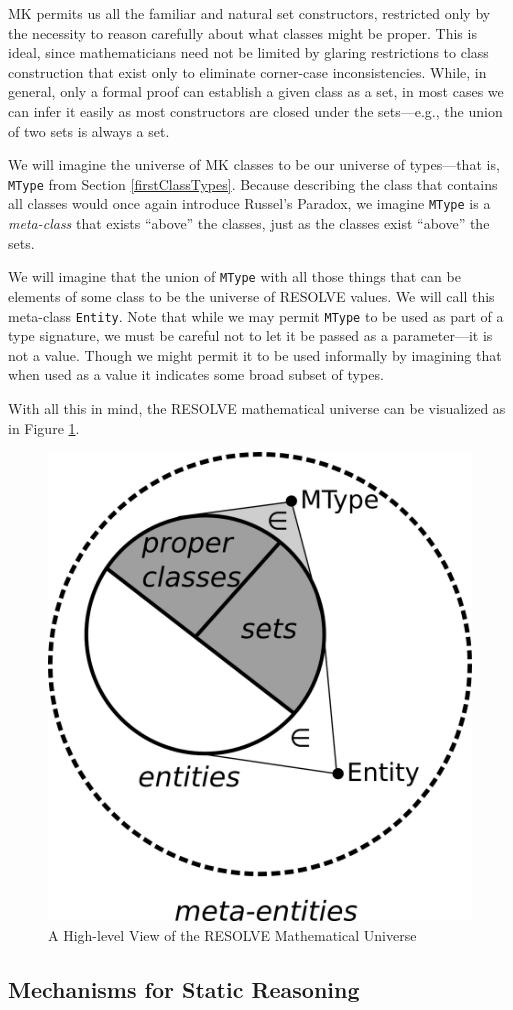 MK permits us all the familiar and natural set constructors, restricted only by the necessity to reason carefully about what classes might be proper.  This is ideal, since mathematicians need not be limited by glaring restrictions to class construction that exist only to eliminate corner-case inconsistencies.  While, in general, only a formal proof can establish a given class as a set, in most cases we can infer it easily as most constructors are closed under the sets---e.g., the union of two sets is always a set.

We will imagine the universe of MK classes to be our universe of types---that is, \texttt{MType} from Section \ref{firstClassTypes}.  Because describing the class that contains all classes would once again introduce Russel's Paradox, we imagine \texttt{MType} is a \emph{meta-class} that exists ``above'' the classes, just as the classes exist ``above'' the sets.

We will imagine that the union of \texttt{MType} with all those things that can be elements of some class to be the universe of RESOLVE values.  We will call this meta-class \texttt{Entity}.  Note that while we may permit \texttt{MType} to be used as part of a type signature, we must be careful not to let it be passed as a parameter---it is not a value.  Though we might permit it to be used informally by imagining that when used as a value it indicates some broad subset of types.

With all this in mind, the RESOLVE mathematical universe can be visualized as in Figure \ref{fig:universe}.

\begin{figure}
  \centering
    \includegraphics[width=.33\textwidth]{universe}
  \caption{A High-level View of the RESOLVE Mathematical Universe\label{fig:universe}}
\end{figure}

	\subsection{Mechanisms for Static Reasoning\label{staticReasoning}}


